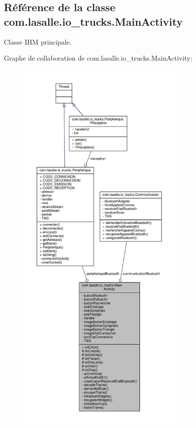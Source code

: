\hypertarget{classcom_1_1lasalle_1_1io__trucks_1_1_main_activity}{}\subsection{Référence de la classe com.\+lasalle.\+io\+\_\+trucks.\+Main\+Activity}
\label{classcom_1_1lasalle_1_1io__trucks_1_1_main_activity}


Classe I\+HM principale.  




Graphe de collaboration de com.\+lasalle.\+io\+\_\+trucks.\+Main\+Activity\+:
\nopagebreak
\begin{figure}[H]
\begin{center}
\leavevmode
\includegraphics[height=550pt]{classcom_1_1lasalle_1_1io__trucks_1_1_main_activity__coll__graph}
\end{center}
\end{figure}
